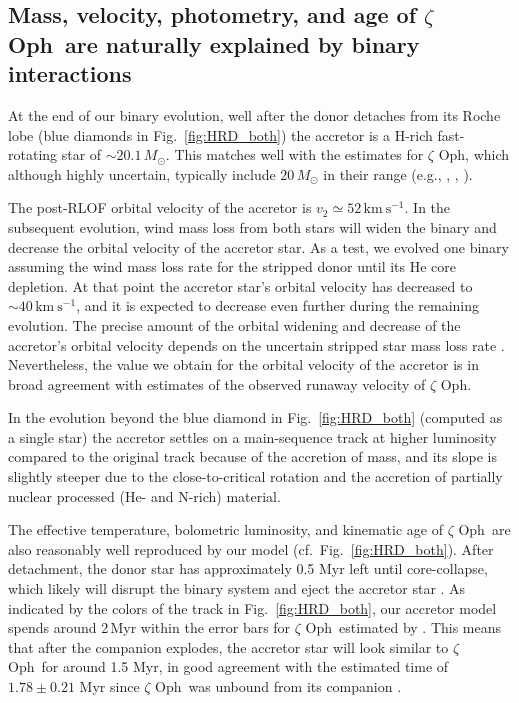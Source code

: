 \documentclass[twocolumn,twocolappendix,trackchanges]{aastex63}
\newcommand{\kms}{{\mathrm{km\ s^{-1}}}}
\DeclareRobustCommand{\Figref}[1]{Fig.~\ref{#1}}
\newcommand{\zoph}{$\zeta$ Oph}
\begin{document}
\subsection{Mass, velocity, photometry, and age of \zoph\ are naturally
  explained by binary interactions}

At the end of our binary evolution, well after the donor detaches from
its Roche lobe (blue diamonds in \Figref{fig:HRD_both}) the accretor
is a H-rich fast-rotating star of $\sim{}20.1\,M_\odot$. This matches
well with the estimates for \zoph, which although highly uncertain,
typically include $20\,M_\odot$ in their range (e.g.,
\citealt{hoogerwerf:01}, ,
\citealt{neuhauser:20}).

The post-RLOF orbital velocity of the
accretor is $v_2\simeq52\,\kms$. In the subsequent evolution, wind
mass loss from both stars will widen the binary and decrease the
orbital velocity of the accretor star.  As a test, we evolved one
binary assuming the \cite{nugis:00} wind mass loss rate for the
stripped donor until its He core depletion. At that point the
accretor star's orbital velocity has decreased to $\sim{}40\,\kms$,
and it is expected to decrease even further during the remaining
evolution. 
The precise amount of the orbital widening and decrease of
the accretor's orbital velocity depends on the uncertain stripped
star mass loss rate \citep[e.g.,][]{vink:17, sander:20}. Nevertheless,
the value we obtain for the orbital velocity of the accretor is in broad agreement with estimates of the
observed runaway velocity of \zoph.

In the evolution beyond the blue diamond in \Figref{fig:HRD_both}
(computed as a single star) the accretor settles on a main-sequence
track at higher luminosity compared to the original track because of
the accretion of mass, and its slope is slightly steeper due to the
close-to-critical rotation and the accretion of partially nuclear
processed (He- and N-rich) material. 

The effective temperature, bolometric luminosity, and kinematic age of
\zoph\ are also reasonably well reproduced by our model (cf.~\Figref{fig:HRD_both}). After
detachment, the donor star has approximately 0.5 Myr left until
core-collapse, which likely will disrupt the binary system and eject
the accretor star \citep[e.g.,][]{renzo:19walk}. As indicated by the colors
of the track in \Figref{fig:HRD_both}, our accretor model spends
around 2\,Myr within the error bars for \zoph\ estimated by
. This means that after the companion explodes,
the accretor star will look similar to \zoph\ for around 1.5 Myr, in
good agreement with the estimated time  of $1.78\pm0.21$ Myr since \zoph\ was unbound from its companion
\citep{neuhauser:20}.
\end{document}
